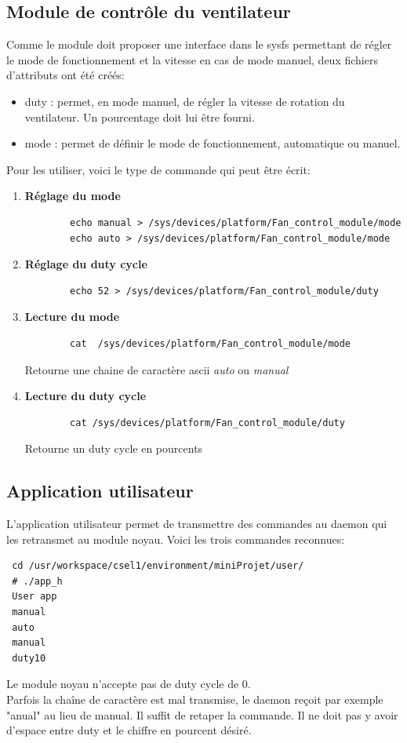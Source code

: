 \subsection{Module de contrôle du ventilateur}
Comme le module doit proposer une interface dans le sysfs permettant de régler le mode de fonctionnement et la vitesse en cas de mode manuel, deux fichiers d'attributs ont été créés:
\begin{itemize}
	\item duty : permet, en mode manuel, de régler la vitesse de rotation du ventilateur. Un pourcentage doit lui être fourni.
	\item mode : permet de définir le mode de fonctionnement, automatique ou manuel. 
\end{itemize}
Pour les utiliser, voici le type de commande qui peut être écrit:\\
\begin{enumerate}
	\item \textbf{Réglage du mode}\\
	\begin{lstlisting}
		echo manual > /sys/devices/platform/Fan_control_module/mode
		echo auto > /sys/devices/platform/Fan_control_module/mode
	\end{lstlisting}
	\item \textbf{Réglage du duty cycle}
	\begin{lstlisting}
		echo 52 > /sys/devices/platform/Fan_control_module/duty
	\end{lstlisting}
	\item \textbf{Lecture du mode}
	\begin{lstlisting}
		cat  /sys/devices/platform/Fan_control_module/mode
	\end{lstlisting}
	Retourne une chaine de caractère ascii \textit{auto} ou \textit{manual}
	\item \textbf{Lecture du duty cycle}
	\begin{lstlisting}
		cat /sys/devices/platform/Fan_control_module/duty 
	\end{lstlisting}
	Retourne un duty cycle en pourcents
\end{enumerate}

\subsection{Application utilisateur}
L'application utilisateur permet de transmettre des commandes au daemon qui les retransmet au module noyau. Voici les trois commandes reconnues:
\begin{lstlisting}
 cd /usr/workspace/csel1/environment/miniProjet/user/
 # ./app_h 
 User app
 manual
 auto
 manual
 duty10
\end{lstlisting}
Le module noyau n'accepte pas de duty cycle de 0.\\
Parfois la chaîne de caractère est mal transmise, le daemon reçoit par exemple "anual" au lieu de manual. Il suffit de retaper la commande. Il ne doit pas y avoir d'espace entre duty et le chiffre en pourcent désiré.
